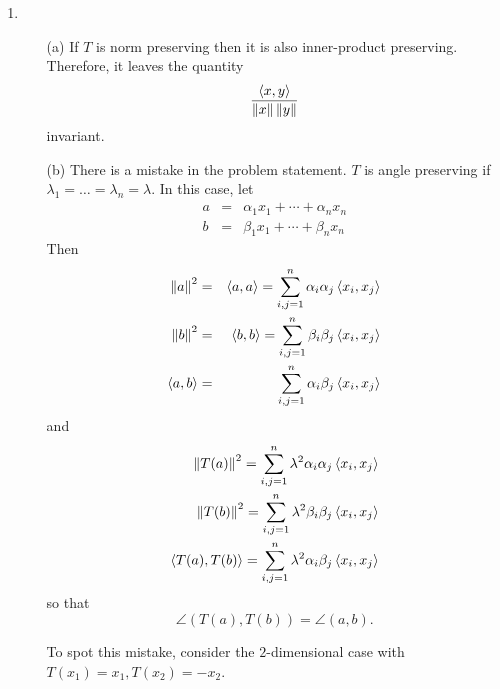 \begin{enumerate}
\item 
\begin{enumerate}
\item[(a)] If $T$ is norm preserving then it is also inner-product preserving.
Therefore, it leaves the quantity
\[
\frac{\left\langle{x, y}\right\rangle}{\left\Vert{x}\right\Vert\left\Vert{y}\right\Vert}
\]
invariant. 

\item[(b)] There is a mistake in the problem statement. $T$ is angle preserving
if $\lambda_1 = \ldots = \lambda_n = \lambda$. In this case, let
\begin{eqnarray*}
a &=& \alpha_1 x_1 + \cdots + \alpha_n x_n \\
b &=& \beta_1 x_1 + \cdots + \beta_n x_n 
\end{eqnarray*}
Then
\begin{eqnarray*}
\left\Vert{a}\right\Vert^2 &=& \left\langle{a, a}\right\rangle = \sum_{i,j=1}^n\alpha_i\alpha_j\left\langle{x_i, x_j}\right\rangle \\
\left\Vert{b}\right\Vert^2 &=& \left\langle{b, b}\right\rangle = \sum_{i,j=1}^n\beta_i\beta_j\left\langle{x_i, x_j}\right\rangle \\
\left\langle{a, b}\right\rangle &=& \sum_{i,j=1}^n\alpha_i\beta_j\left\langle{x_i, x_j}\right\rangle
\end{eqnarray*}
and
\begin{eqnarray*}
\left\Vert{T(a)}\right\Vert^2 = \sum_{i,j=1}^n\lambda^2\alpha_i\alpha_j\left\langle{x_i, x_j}\right\rangle \\
\left\Vert{T(b)}\right\Vert^2 = \sum_{i,j=1}^n\lambda^2\beta_i\beta_j\left\langle{x_i, x_j}\right\rangle \\
\left\langle{T(a), T(b)}\right\rangle = \sum_{i,j=1}^n\lambda^2\alpha_i\beta_j\left\langle{x_i, x_j}\right\rangle
\end{eqnarray*}
so that
\[
\angle(T(a),T(b)) = \angle(a, b).
\]

To spot this mistake, consider the $2$-dimensional case with $T(x_1) = x_1,
T(x_2) = -x_2$.


\end{enumerate}
\end{enumerate}
